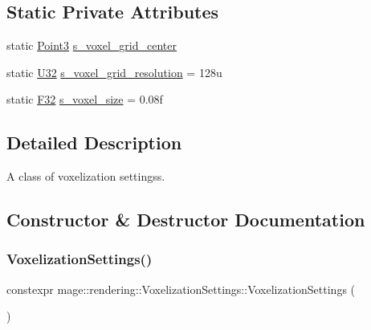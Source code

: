 \subsection*{Static Private Attributes}
\begin{DoxyCompactItemize}
\item 
static \hyperlink{structmage_1_1_point3}{Point3} \hyperlink{classmage_1_1rendering_1_1_voxelization_settings_a37151063ebbf6ae6ea193fb0ce05d270}{s\+\_\+voxel\+\_\+grid\+\_\+center}
\item 
static \hyperlink{namespacemage_a41c104c036fba3756a74e19f793eeaa1}{U32} \hyperlink{classmage_1_1rendering_1_1_voxelization_settings_aa709675f6700320077718e1954854ca6}{s\+\_\+voxel\+\_\+grid\+\_\+resolution} = 128u
\item 
static \hyperlink{namespacemage_aa97e833b45f06d60a0a9c4fc22ae02c0}{F32} \hyperlink{classmage_1_1rendering_1_1_voxelization_settings_a647150f56ef8546b6e18f5ad8dd2e661}{s\+\_\+voxel\+\_\+size} = 0.\+08f
\end{DoxyCompactItemize}


\subsection{Detailed Description}
A class of voxelization settingss. 

\subsection{Constructor \& Destructor Documentation}
\hypertarget{classmage_1_1rendering_1_1_voxelization_settings_a5c866be104571097091b07f113b2f680}{}\label{classmage_1_1rendering_1_1_voxelization_settings_a5c866be104571097091b07f113b2f680} 
\subsubsection{\texorpdfstring{Voxelization\+Settings()}{VoxelizationSettings()}\hspace{0.1cm}{\footnotesize\ttfamily [1/3]}}
{\footnotesize\ttfamily constexpr mage\+::rendering\+::\+Voxelization\+Settings\+::\+Voxelization\+Settings (\begin{DoxyParamCaption}{ }\end{DoxyParamCaption})}

